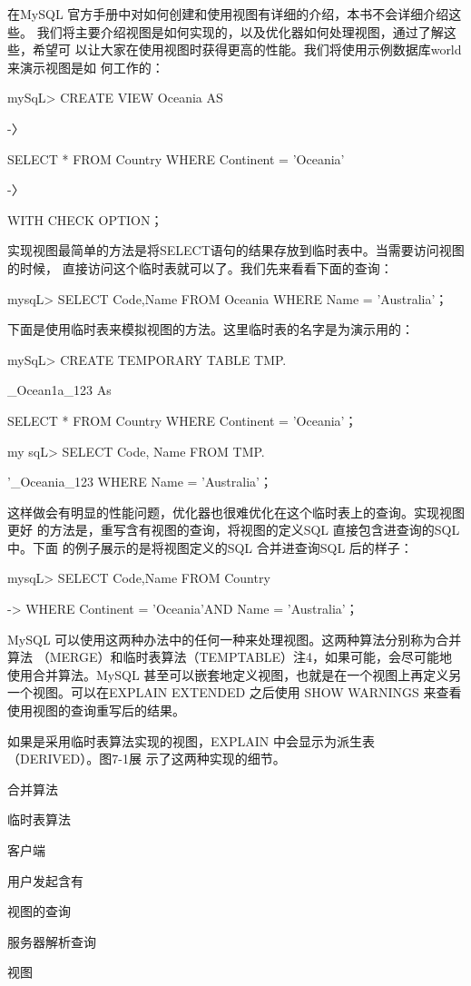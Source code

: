 在MySQL 官方手册中对如何创建和使用视图有详细的介绍，本书不会详细介绍这些。
我们将主要介绍视图是如何实现的，以及优化器如何处理视图，通过了解这些，希望可
以让大家在使用视图时获得更高的性能。我们将使用示例数据库world来演示视图是如
何工作的：

mySqL> CREATE VIEW Oceania AS

-〉

SELECT * FROM Country WHERE Continent = 'Oceania'

-〉

WITH CHECK OPTION；

实现视图最简单的方法是将SELECT语句的结果存放到临时表中。当需要访问视图的时候，
直接访问这个临时表就可以了。我们先来看看下面的查询：

mysqL> SELECT Code,Name FROM Oceania WHERE Name = 'Australia'；

下面是使用临时表来模拟视图的方法。这里临时表的名字是为演示用的：

mySqL> CREATE TEMPORARY TABLE TMP.

\_Ocean1a\_123 As

SELECT * FROM Country WHERE Continent = 'Oceania'；

my sqL> SELECT Code, Name FROM TMP.

'\_Oceania\_123 WHERE Name = 'Australia'；

这样做会有明显的性能问题，优化器也很难优化在这个临时表上的查询。实现视图更好
的方法是，重写含有视图的查询，将视图的定义SQL 直接包含进查询的SQL中。下面
的例子展示的是将视图定义的SQL 合并进查询SQL 后的样子：

mysqL> SELECT Code,Name FROM Country

-> WHERE Continent = 'Oceania'AND Name = 'Australia'；

MySQL 可以使用这两种办法中的任何一种来处理视图。这两种算法分别称为合并算法
（MERGE）和临时表算法（TEMPTABLE）注4，如果可能，会尽可能地使用合并算法。MySQL
甚至可以嵌套地定义视图，也就是在一个视图上再定义另一个视图。可以在EXPLAIN
EXTENDED 之后使用 SHOW WARNINGS 来查看使用视图的查询重写后的结果。

如果是采用临时表算法实现的视图，EXPLAIN 中会显示为派生表（DERIVED）。图7-1展
示了这两种实现的细节。

合并算法

临时表算法

客户端

用户发起含有

视图的查询

服务器解析查询

视图


